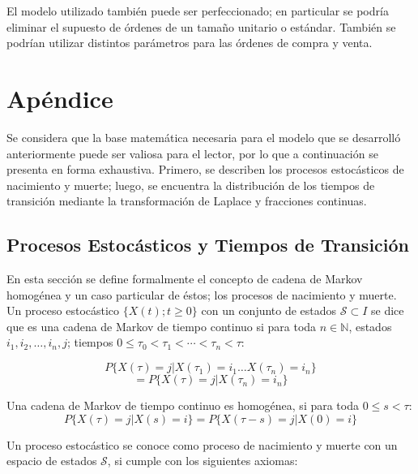 \documentclass[11pt]{article}
\numberwithin{equation}{section} %
\providecommand{\DIFadd}[1]{{\protect\color{blue}\uwave{#1}}} %
\providecommand{\DIFdel}[1]{{\protect\color{red}\sout{#1}}}                      %
\providecommand{\DIFaddbegin}{} %
\providecommand{\DIFaddend}{} %
\providecommand{\DIFdelbegin}{} %
\providecommand{\DIFdelend}{} %
\begin{document}
El modelo utilizado también puede ser perfeccionado; en particular se podría eliminar el supuesto de órdenes de un tamaño unitario o estándar. También se podrían utilizar distintos parámetros para las órdenes de compra y venta.


\clearpage

\appendix
\section{Apéndice} \label{App:AppendixA}

Se considera que la base matemática necesaria para el modelo que se desarrolló anteriormente puede ser valiosa para el lector, por lo que a continuación se presenta en forma exhaustiva. Primero, se describen los procesos estocásticos de nacimiento y muerte; luego, se encuentra la distribución de los tiempos de transición mediante la transformación de Laplace y fracciones continuas.\\

\subsection{Procesos Estocásticos y Tiempos de Transición}

En esta sección se define formalmente el concepto de cadena de Markov homogénea y un caso particular de éstos; los procesos de nacimiento y muerte. Un proceso estocástico $\{X(t);t\geq 0\}$ con un conjunto de estados \DIFdelbegin \DIFdel{$\mathcal{S} \subset I$ }\DIFdelend \DIFaddbegin \DIFadd{$\mathcal{S} \subset \mathbb{N}$ }\DIFaddend se dice que es una cadena de Markov de tiempo continuo si para toda $n \in \mathbb{N}$, estados $i_{1},i_{2},\ldots,i_{n},j$; tiempos $0\leq\tau_0<\tau_1<\cdots<\tau_n<\tau$:

\[
P\{X(\tau)=j|X(\tau_1)=i_1\ldots X(\tau_n)=i_n\}
\]
\begin{equation}
= P\{X(\tau)=j|X(\tau_n)=i_n\}
\end{equation}

Una cadena de Markov de tiempo continuo es homogénea, si para toda $0\leq s <\tau$:
\begin{equation}
P\{X(\tau)=j|X(s)=i\}=P\{X(\tau-s)=j|X(0)=i\}
\end{equation}

Un proceso estocástico se conoce como proceso de nacimiento y muerte con un espacio de estados $\mathcal{S}$, si cumple con los siguientes axiomas:
\end{document}
